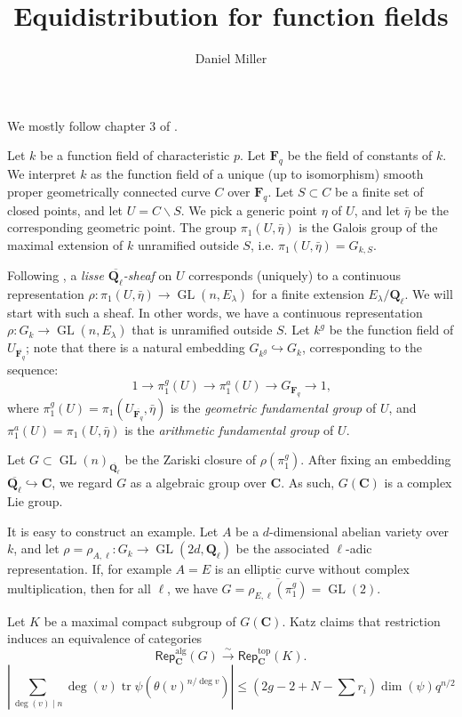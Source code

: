 \documentclass{article}
\title{Equidistribution for function fields}
\author{Daniel Miller}
\DeclareMathOperator{\gl}{GL}
\newcommand{\dC}{\mathbf{C}}
\newcommand{\dF}{\mathbf{F}}
\newcommand{\dQ}{\mathbf{Q}}
\begin{document}
\maketitle




We mostly follow chapter 3 of \cite{ka88}.

Let $k$ be a function field of characteristic $p$. Let $\dF_q$ be the field of 
constants of $k$. We interpret $k$ as the function field of a unique (up to 
isomorphism) smooth proper geometrically connected curve $C$ over $\dF_q$. Let 
$S\subset C$ be a finite set of closed points, and let $U=C\smallsetminus S$. 
We pick a generic point $\eta$ of $U$, and let $\bar\eta$ be the corresponding 
geometric point. The group $\pi_1(U,\bar\eta)$ is the Galois group of the 
maximal extension of $k$ unramified outside $S$, i.e. 
$\pi_1(U,\bar\eta)=G_{k,S}$. 

Following \cite[2.2.4]{de77}, a \emph{lisse $\overline{\dQ_\ell}$-sheaf} on $U$ 
corresponds (uniquely) to a continuous representation 
$\rho:\pi_1(U,\bar\eta) \to \gl(n,E_\lambda)$ for a finite extension 
$E_\lambda/\dQ_\ell$. We will start with such a sheaf. In other words, we have 
a continuous representation $\rho:G_k \to \gl(n,E_\lambda)$ that is unramified 
outside $S$. Let $k^g$ be the function field of $U_{\overline{\dF_q}}$; note 
that there is a natural embedding $G_{k^g}\hookrightarrow G_k$, corresponding 
to the sequence:
\[
  1 \to \pi_1^g(U) \to \pi_1^a(U) \to G_{\dF_q} \to 1\text{,}
\]
where $\pi_1^g(U)=\pi_1(U_{\overline{\dF_q}},\bar\eta)$ is the \emph{geometric 
fundamental group} of $U$, and $\pi_1^a(U)=\pi_1(U,\bar\eta)$ is the 
\emph{arithmetic fundamental group} of $U$. 

Let $G\subset \gl(n)_{\overline{\dQ_\ell}}$ be the Zariski closure 
of $\rho(\pi_1^g)$. After fixing an embedding 
$\overline{\dQ_\ell}\hookrightarrow\dC$, we regard $G$ as a algebraic group 
over $\dC$. As such, $G(\dC)$ is a complex Lie group. 

It is easy to construct an example. Let $A$ be a $d$-dimensional abelian variety 
over $k$, and let $\rho=\rho_{A,\ell}:G_k \to \gl(2 d,\dQ_\ell)$ be the 
associated $\ell$-adic representation. If, for example $A=E$ is an elliptic 
curve without complex multiplication, then for all $\ell$, we have 
$G=\overline{\rho_{E,\ell}(\pi_1^g)}=\gl(2)$. 

Let $K$ be a maximal compact subgroup of $G(\dC)$. Katz claims that restriction 
induces an equivalence of categories 
\[
  \mathsf{Rep}_\dC^\text{alg}(G) \xrightarrow\sim \mathsf{Rep}_\dC^\text{top}(K) \text{.}
\]
\[
  \left|\sum_{\deg(v)\mid n} \deg(v) \operatorname{tr} \psi\left(\theta(v)^{n/\deg v}\right)\right| \leqslant \left(2 g-2+N-\sum r_i\right) \dim(\psi) q^{n/2}
\]







\end{document}
